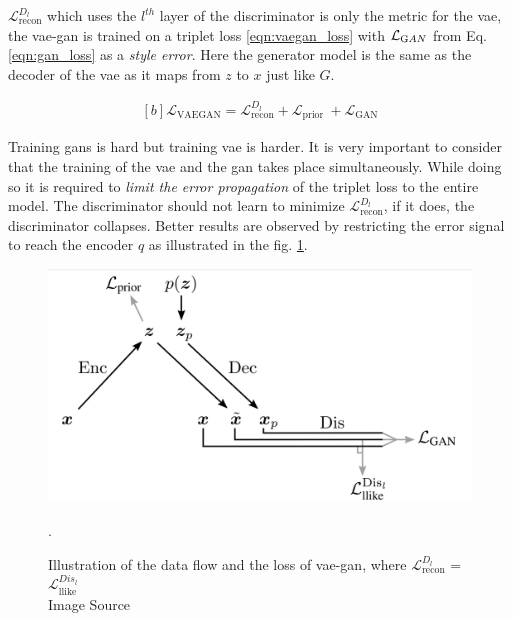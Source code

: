 $\mathcal{L}_{\text {recon}}^{D_{l}}$ which uses the $l^{th}$ layer of the discriminator is only the metric for the \ac{vae}, the \ac{vae}-\ac{gan} is trained on a triplet loss \ref{eqn:vaegan_loss} with $\mathcal{L}_{\text GAN}$ from Eq. \ref{eqn:gan_loss} as a \textit{style error}. Here the generator model is the same as the decoder of the \ac{vae} as it maps from $z$ to $x$ just like $G$.

\begin{equation} \label{eqn:vaegan_loss}
    \begin{gathered}[b]
    \mathcal{L}_{\mathrm{VAEGAN}} = \mathcal{L}_{\text {recon}}^{D_{l}} +\mathcal{L}_{\text {prior }} + \mathcal{L}_{\text {GAN}}
    \end{gathered}
\end{equation}

Training \acp{gan} is hard but training \ac{vae} is harder. It is very important to consider that the training of the \ac{vae} and the \ac{gan} takes place simultaneously. While doing so it is required to \textit{limit the error propagation} of the triplet loss to the entire model. The discriminator should not learn to minimize $\mathcal{L}_{\text {recon}}^{D_{l}}$, if it does, the discriminator collapses. Better results are observed by restricting the error signal to reach the encoder $q$ as illustrated in the fig. \ref{fig:vaegan_loss_graph}. 

\begin{figure}[!h]
    \centering
    \includegraphics[scale=0.35]{figures/arch/vae_gan_loss_graph.png}
    \caption{Illustration of the data flow and the loss of \ac{vae}-\ac{gan}, where $\mathcal{L}_{\text {recon}}^{D_{l}}$ = $\mathcal{L}_{\text {llike}}^{Dis_{l}}$ \\
    Image Source \cite{autoencoding_beyond_pixels}}. 
    \label{fig:vaegan_loss_graph}
\end{figure}

